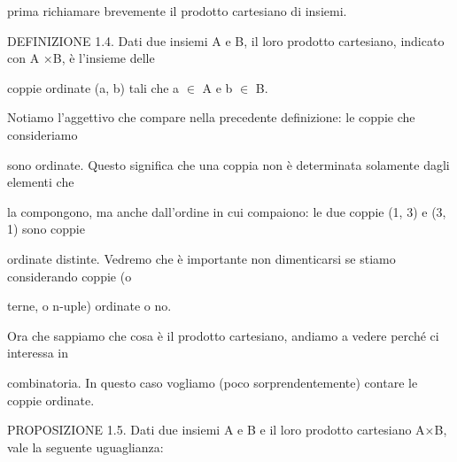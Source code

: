 \documentclass[a4paper,portrait,12pt]{article}
\begin{document}
\begin{flushleft}
prima richiamare brevemente il prodotto cartesiano di insiemi.
\end{flushleft}


\begin{flushleft}
DEFINIZIONE 1.4. Dati due insiemi A e B, il loro prodotto cartesiano, indicato con A ×B, \`{e} l'insieme delle
\end{flushleft}


\begin{flushleft}
coppie ordinate (a, b) tali che a $\in$ A e b $\in$ B.
\end{flushleft}


\begin{flushleft}
Notiamo l'aggettivo che compare nella precedente definizione: le coppie che consideriamo
\end{flushleft}


\begin{flushleft}
sono ordinate. Questo significa che una coppia non \`{e} determinata solamente dagli elementi che
\end{flushleft}


\begin{flushleft}
la compongono, ma anche dall'ordine in cui compaiono: le due coppie (1, 3) e (3, 1) sono coppie
\end{flushleft}


\begin{flushleft}
ordinate distinte. Vedremo che \`{e} importante non dimenticarsi se stiamo considerando coppie (o
\end{flushleft}


\begin{flushleft}
terne, o n-uple) ordinate o no.
\end{flushleft}


\begin{flushleft}
Ora che sappiamo che cosa \`{e} il prodotto cartesiano, andiamo a vedere perch\'{e} ci interessa in
\end{flushleft}


\begin{flushleft}
combinatoria. In questo caso vogliamo (poco sorprendentemente) contare le coppie ordinate.
\end{flushleft}


\begin{flushleft}
PROPOSIZIONE 1.5. Dati due insiemi A e B e il loro prodotto cartesiano A×B, vale la seguente uguaglianza:
\end{flushleft}
\end{document}
